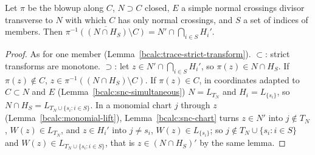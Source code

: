\begin{lemma}
\label{bcalc:member-intersection-strict}
\leanok
Let \(\pi\) be the blowup along \(C\), \(N\supset C\) closed, \(E\) a simple normal crossings divisor transverse to \(N\) with which \(C\) has only normal
crossings, and \(S\) a set of indices of members. Then \(\overline{\pi^{-1}((N\cap H_S)\setminus C)}=N'\cap\bigcap_{i\in S}H_i'\).
\end{lemma}
\begin{proof}
\leanok
As for one member (Lemma~\ref{bcalc:trace-strict-transform}). \(\subset\): strict transforms are monotone. \(\supset\): let \(z\in N'\cap\bigcap_{i\in S}H_i'\), so
\(\pi(z)\in N\cap H_S\). If \(\pi(z)\notin C\), \(z\in\pi^{-1}((N\cap H_S)\setminus C)\). If \(\pi(z)\in C\), in coordinates adapted to \(C\subset N\) and \(E\)
(Lemma~\ref{bcalc:snc-simultaneous}) \(N=L_{T_N}\) and \(H_i=L_{\{s_i\}}\), so \(N\cap H_S=L_{T_N\cup\{s_i:i\in S\}}\). In a monomial chart \(j\) through \(z\)
(Lemma~\ref{bcalc:monomial-lift}), Lemma~\ref{bcalc:snc-chart} turns \(z\in N'\) into \(j\notin T_N\), \(W(z)\in L_{T_N}\), and \(z\in H_i'\) into \(j\ne s_i\),
\(W(z)\in L_{\{s_i\}}\); so \(j\notin T_N\cup\{s_i:i\in S\}\) and \(W(z)\in L_{T_N\cup\{s_i:i\in S\}}\), that is \(z\in(N\cap H_S)'\) by the same lemma.
\end{proof}

